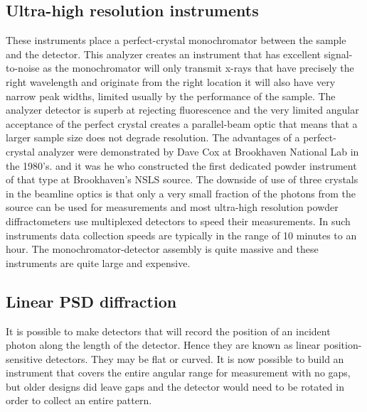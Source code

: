 \subsection{Ultra-high resolution instruments} These instruments place a perfect-crystal monochromator between the sample and the detector. This analyzer creates an instrument that has excellent signal-to-noise as the monochromator will only transmit x-rays that have precisely the right wavelength and originate from the right location it will also have very narrow peak widths, limited usually by the performance of the sample. The analyzer detector is superb at rejecting fluorescence and the very limited angular acceptance of the perfect crystal creates a parallel-beam optic that means that a larger sample size does not degrade resolution. The advantages of a perfect-crystal analyzer were demonstrated by Dave Cox at Brookhaven National Lab in the 1980's. and it was he who constructed the first dedicated powder instrument of that type at Brookhaven's NSLS source. The downside of use of three crystals in the beamline optics is that only a very small fraction of the photons from the source can be used for measurements and most ultra-high resolution powder diffractometers use multiplexed detectors to speed their measurements. In such instruments data collection speeds are typically in the range of 10 minutes to an hour. The monochromator-detector assembly is quite massive and these instruments are quite large and expensive. 

\subsection{Linear PSD diffraction} It is possible to make detectors that will record the position of an incident photon along the length of the detector. Hence they are known as linear position-sensitive detectors. They may be flat or curved. It is now possible to build an instrument that covers the entire angular range for measurement with no gaps, but older designs did leave gaps and the detector would need to be rotated in order to collect an entire pattern. 

